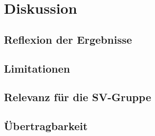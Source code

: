 \section{Diskussion}
\subsection{Reflexion der Ergebnisse}

\subsection{Limitationen}

\subsection{Relevanz für die SV-Gruppe}

\subsection{Übertragbarkeit}
